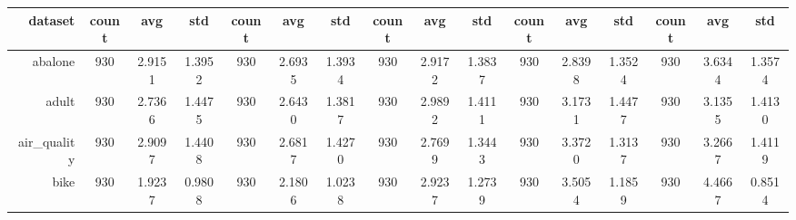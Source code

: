 \begin{table}[htbp]
{\begin{tabular}{rccccccccccccccc}
			\cmidrule{2-16}    \textbf{dataset} & \textbf{count}                        & \textbf{avg}                                                                       & \textbf{std}    & \textbf{count} & \textbf{avg}                                                              & \textbf{std}    & \textbf{count} & \textbf{avg}                                                              & \textbf{std}    & \textbf{count} & \textbf{avg}                                                              & \textbf{std}    & \textbf{count} & \textbf{avg}    & \textbf{std}    \\
			\midrule
			abalone                             & 930                                   & 2.9151                                                                             & 1.3952          & 930            & \cellcolor[rgb]{ .776,  .937,  .808}\textcolor[rgb]{ 0,  .38,  0}{2.6935} & 1.3934          & 930            & 2.9172                                                                    & 1.3837          & 930            & 2.8398                                                                    & 1.3524          & 930            & 3.6344          & 1.3574          \\
			adult                               & 930                                   & 2.7366                                                                             & 1.4475          & 930            & 2.6430                                                                    & 1.3817          & 930            & 2.9892                                                                    & 1.4111          & 930            & 3.1731                                                                    & 1.4477          & 930            & 3.1355          & 1.4130          \\
			air\_quality                        & 930                                   & 2.9097                                                                             & 1.4408          & 930            & \cellcolor[rgb]{ .776,  .937,  .808}\textcolor[rgb]{ 0,  .38,  0}{2.6817} & 1.4270          & 930            & 2.7699                                                                    & 1.3443          & 930            & 3.3720                                                                    & 1.3137          & 930            & 3.2667          & 1.4119          \\
			bike                                & 930                                   & 1.9237                                                                             & 0.9808          & 930            & 2.1806                                                                    & 1.0238          & 930            & 2.9237                                                                    & 1.2739          & 930            & 3.5054                                                                    & 1.1859          & 930            & 4.4667          & 0.8514          \\

\end{tabular}}
\end{table}
